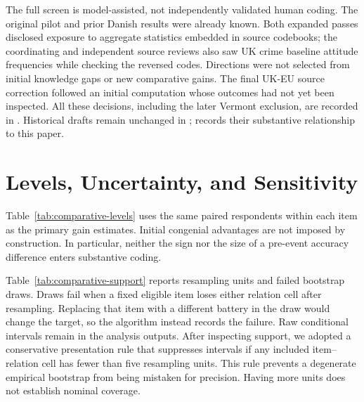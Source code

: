 The full screen is model-assisted, not independently validated human coding. The original pilot and prior Danish results were already known. Both expanded passes disclosed exposure to aggregate statistics embedded in source codebooks; the coordinating and independent source reviews also saw UK crime baseline attitude frequencies while checking the reversed codes. Directions were not selected from initial knowledge gaps or new comparative gains. The final UK-EU source correction followed an initial computation whose outcomes had not yet been inspected. All these decisions, including the later Vermont exclusion, are recorded in . Historical drafts remain unchanged in ;  records their substantive relationship to this paper.

\section{Levels, Uncertainty, and Sensitivity}

Table~\ref{tab:comparative-levels} uses the same paired respondents within each item as the primary gain estimates. Initial congenial advantages are not imposed by construction. In particular, neither the sign nor the size of a pre-event accuracy difference enters substantive coding.

\begin{table}[H]
\centering\small
\caption{Accuracy before and after the event on the primary item set.}
\label{tab:comparative-levels}

\end{table}

Table~\ref{tab:comparative-support} reports resampling units and failed bootstrap draws. Draws fail when a fixed eligible item loses either relation cell after resampling. Replacing that item with a different battery in the draw would change the target, so the algorithm instead records the failure. Raw conditional intervals remain in the analysis outputs. After inspecting support, we adopted a conservative presentation rule that suppresses intervals if any included item--relation cell has fewer than five resampling units. This rule prevents a degenerate empirical bootstrap from being mistaken for precision. Having more units does not establish nominal coverage.

